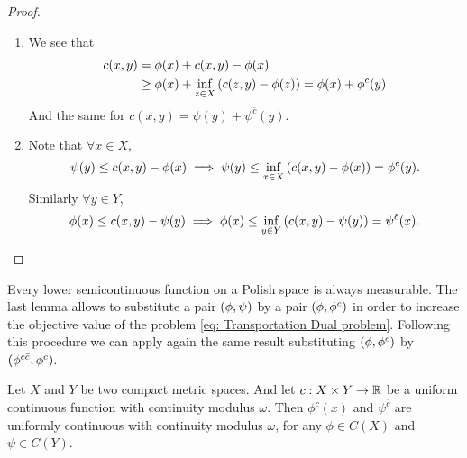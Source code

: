 \begin{proof}

\begin{enumerate}
\item  We see that 
\begin{align*}
c(x,y)&=\phi(x)+c(x,y)-\phi(x)\\
		&\geq\phi(x)+\inf_{z\in X} \left( c(z,y)-\phi(z) \right)=\phi(x)+\phi^c(y)
\end{align*}
And the same for $c(x,y)=\psi(y)+\psi^{\bar c}(y)$.

\item  Note that $\forall x\in X$,
\begin{equation*}
\psi(y)\leq c(x,y)-\phi(x)\implies\psi(y)\leq \inf_{x\in X}\left( c(x,y)-\phi(x) \right)=\phi^c(y). 
\end{equation*}	
Similarly $\forall y \in Y$,
\begin{equation*}
\phi(x)\leq c(x,y)-\psi(y)\implies\phi(x)\leq\inf_{y\in Y}\left( c(x,y)-\psi(y) \right)=\psi^{\bar{c}}(x).
\end{equation*}	
\end{enumerate}	
	
\end{proof}
Every lower semicontinuous function on a Polish space is always measurable. The last lemma allows to substitute a pair $\left( \phi, \psi \right)$ by a pair $\left( \phi,\phi^c \right)$ in order to increase the objective value of the problem \eqref{eq: Transportation Dual problem}. Following this procedure we can  apply again the same result substituting $\left( \phi,\phi^c \right)$ by $\left( \phi^{c\bar c}, \phi^c \right)$.  \\
\begin{lemma}
	Let $X$ and $Y$ be two compact metric spaces. And let $c:X\times Y \rightarrow \mathbb{R}$ be a uniform continuous function with continuity modulus $\omega$. Then $\phi^c(x)$ and $\psi^{\bar{c}}$ are uniformly continuous with continuity modulus $\omega$, for any $\phi\in C(X)$ and $\psi\in C(Y)$.
\end{lemma}
